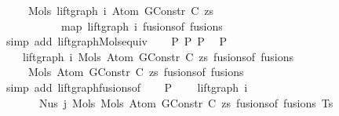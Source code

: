 \begin{isabellebody}
\ \ \ \ \ Mols{}\ {\isacharparenleft}{\kern0pt}lift{\isacharunderscore}{\kern0pt}graph\ i\ {\isacharparenleft}{\kern0pt}Atom\ {\isacharparenleft}{\kern0pt}GConstr\ C{\isacharparenright}{\kern0pt}\ zs{\isacharparenright}{\kern0pt}{\isacharparenright}{\kern0pt}\isanewline
\ \ \ \ \ \ \ \ \ \ \ {\isacharparenleft}{\kern0pt}map\ {\isacharparenleft}{\kern0pt}lift{\isacharunderscore}{\kern0pt}graph\ i{\isacharparenright}{\kern0pt}\ {\isacharparenleft}{\kern0pt}fusions{\isacharunderscore}{\kern0pt}of\ fusions{\isacharparenright}{\kern0pt}{\isacharparenright}{\kern0pt}{\isachardoublequoteclose}\isanewline
\ \ \ \ \isamarkupfalse%
\ {\isacharparenleft}{\kern0pt}simp\ add{\isacharcolon}{\kern0pt}\ lift{\isacharunderscore}{\kern0pt}graph{\isacharunderscore}{\kern0pt}Mols{}{\isacharunderscore}{\kern0pt}equiv{\isacharparenright}{\kern0pt}\isanewline
\isanewline
\ \ \isamarkupfalse%
\ P{}\ P{}\ P{}\ \isamarkupfalse%
\ P{}{\isacharcolon}{\kern0pt}\isanewline
\ \ \ \ {\isachardoublequoteopen}lift{\isacharunderscore}{\kern0pt}graph\ i\ {\isacharparenleft}{\kern0pt}Mols{}\ {\isacharparenleft}{\kern0pt}Atom\ {\isacharparenleft}{\kern0pt}GConstr\ C{\isacharparenright}{\kern0pt}\ zs{\isacharparenright}{\kern0pt}\ {\isacharparenleft}{\kern0pt}fusions{\isacharunderscore}{\kern0pt}of\ fusions{\isacharparenright}{\kern0pt}{\isacharparenright}{\kern0pt}\ {\isacharequal}{\kern0pt}\isanewline
\ \ \ \ \ Mols{}\ {\isacharparenleft}{\kern0pt}Atom\ {\isacharparenleft}{\kern0pt}GConstr\ C{\isacharparenright}{\kern0pt}\ zs{\isacharparenright}{\kern0pt}\ {\isacharparenleft}{\kern0pt}fusions{\isacharunderscore}{\kern0pt}of\ fusions{\isacharparenright}{\kern0pt}{\isachardoublequoteclose}\isanewline
\ \ \ \ \isamarkupfalse%
\ {\isacharparenleft}{\kern0pt}simp\ add{\isacharcolon}{\kern0pt}\ lift{\isacharunderscore}{\kern0pt}graph{\isacharunderscore}{\kern0pt}fusions{\isacharunderscore}{\kern0pt}of{\isacharparenright}{\kern0pt}\isanewline
\isanewline
\ \ \isamarkupfalse%
\ P{}{\isacharcolon}{\kern0pt}\isanewline
\ \ \ \ {\isachardoublequoteopen}lift{\isacharunderscore}{\kern0pt}graph\ i\isanewline
\ \ \ \ \ \ \ {\isacharparenleft}{\kern0pt}Nus{}\ j\ {\isacharparenleft}{\kern0pt}Mols{}\ {\isacharparenleft}{\kern0pt}Mols{}\ {\isacharparenleft}{\kern0pt}Atom\ {\isacharparenleft}{\kern0pt}GConstr\ C{\isacharparenright}{\kern0pt}\ zs{\isacharparenright}{\kern0pt}\ {\isacharparenleft}{\kern0pt}fusions{\isacharunderscore}{\kern0pt}of\ fusions{\isacharparenright}{\kern0pt}{\isacharparenright}{\kern0pt}\ Ts{\isacharparenright}{\kern0pt}{\isacharparenright}{\kern0pt}\ {\isacharequal}{\kern0pt}\isanewline

\end{isabellebody}
